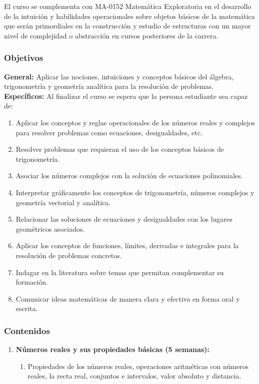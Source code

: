 \begin{refsection}
El curso se complementa con MA-0152 Matemática Exploratoria en el desarrollo de la intuición y habilidades operacionales sobre objetos básicos de la matemática que serán primordiales en la construcción y estudio de estructuras con un mayor nivel de complejidad o abstracción en cursos posteriores de la carrera.

\subsubsection*{Objetivos}

\textbf{General:} Aplicar las nociones, intuiciones y conceptos básicos del álgebra, trigonometría y geometría analítica para la resolución de problemas. \\

\textbf{Específicos:} Al finalizar el curso se espera que la persona estudiante sea capaz de:

\begin{enumerate}
\item Aplicar los conceptos y reglas operacionales de los números reales y complejos para resolver problemas como ecuaciones, desigualdades, etc.
\item Resolver problemas que requieran el uso de los conceptos básicos de trigonometría.
\item Asociar los números complejos con la solución de ecuaciones polinomiales.
\item Interpretar gráficamente los conceptos de trigonometría, números complejos y geometría vectorial y analítica.
\item Relacionar las soluciones de ecuaciones y desigualdades con los lugares geométricos asociados.
\item Aplicar los conceptos de funciones, límites, derivadas e integrales para la resolución de problemas concretos.
\item Indagar en la literatura sobre temas que permitan complementar su formación.
\item Comunicar ideas matemáticas de manera clara y efectiva en forma oral y escrita.
\end{enumerate}

\subsubsection*{Contenidos}
\begin{enumerate}
\item \textbf{Números reales y sus propiedades básicas (5 semanas):} 
\begin{enumerate}
    \item Propiedades de los números reales, operaciones aritméticas con números reales, la recta real, conjuntos e intervalos, valor absoluto y distancia.
    

\end{enumerate}
\end{enumerate}
\end{refsection}
